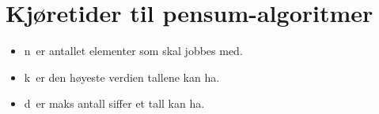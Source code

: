 \documentclass[12pt]{report}
\begin{document}
\section*{Kjøretider til pensum-algoritmer}
\begin{itemize}
	\item {\fontsize{10pt}{12.0pt}\selectfont n er antallet elementer som skal jobbes med.\par}\par

	\item {\fontsize{10pt}{12.0pt}\selectfont k er den høyeste verdien tallene kan ha.\par}\par

	\item {\fontsize{10pt}{12.0pt}\selectfont d er maks antall siffer et tall kan ha. \par}
\end{itemize}\par


\vspace{\baselineskip}


\end{document}
